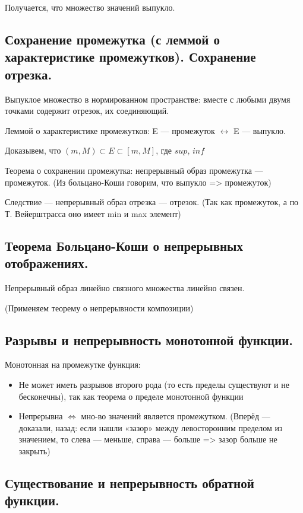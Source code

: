 \documentclass[12pt, a4paper]{article}
\begin{document}
Получается, что множество значений выпукло.

\subsection{Сохранение промежутка (с леммой о характеристике промежутков). Сохранение отрезка.}

Выпуклое множество в нормированном пространстве: вместе с любыми двумя точками содержит отрезок, их соединяющий.

Леммой о характеристике промежутков: 
E — промежуток $\leftrightarrow$ E — выпукло.

Доказывем, что $(m, M) \subset E \subset [m, M]$, где $sup$, $inf$

Теорема о сохранении промежутка: непрерывный образ промежутка — промежуток. (Из больцано-Коши говорим, что выпукло => промежуток)

Следствие — непрерывный образ отрезка — отрезок. (Так как промежуток, а по Т. Вейерштрасса оно имеет min и max элемент)


\subsection{Теорема Больцано-Коши о непрерывных отображениях.}

Непрерывный образ линейно связного множества линейно связен.

(Применяем теорему о непрерывности композиции)


\subsection{Разрывы и непрерывность монотонной функции.}

Монотонная на промежутке функция:

\begin{itemize}
    \item Не может иметь разрывов второго рода (то есть пределы существуют и не бесконечны), так как теорема о пределе монотонной функции
    \item Непрерывна $\Longleftrightarrow$ мно-во значений является промежутком. (Вперёд — доказали, назад: если нашли «зазор» между левосторонним пределом из значением, то слева — меньше, справа — больше => зазор больше не закрыть)
\end{itemize}


\subsection{Существование и непрерывность обратной функции.}
\end{document}
